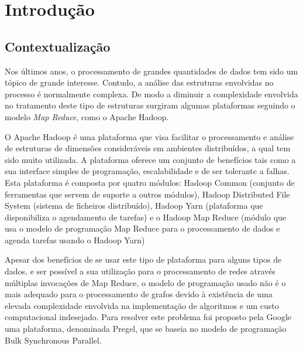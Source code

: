 \chapter{Introdução}

\section{Contextualização}
Nos últimos anos, o processamento de grandes quantidades de dados tem sido um tópico de grande interesse. Contudo, a análise das estruturas envolvidas no processo 
é normalmente complexa. De modo a diminuir a complexidade envolvida no tratamento deste tipo de estruturas surgiram algumas plataformas seguindo o modelo \textit{Map Reduce}, como o Apache Hadoop\cite{hadoop}.

O Apache Hadoop\cite{hadoop} é uma plataforma que visa facilitar o processamento e análise de estruturas de dimensões consideráveis em ambientes distribuídos, a qual tem sido muito utilizada.
A plataforma oferece um conjunto de benefícios tais como a sua interface simples de programação, escalabilidade e de ser tolerante a falhas.
Esta plataforma é composta por quatro módulos:
Hadoop Common (conjunto de ferramentas que servem de suporte a outros módulos),
Hadoop Distributed File System (sistema de ficheiros distribuído),
Hadoop Yarn (plataforma que disponibiliza o agendamento de tarefas)
e o Hadoop Map Reduce (módulo que usa o modelo de programação Map Reduce para o processamento de dados e agenda tarefas usando o Hadoop Yarn)

Apesar dos benefícios de se usar este tipo de plataforma para alguns tipos de dados, e ser possível a sua utilização para o processamento de redes através múltiplas invocações de Map Reduce, o modelo de programação usado  não é o mais adequado para o processamento de grafos devido à existência de  uma elevada complexidade envolvida na implementação de algoritmos e um custo computacional indesejado.
Para resolver este problema foi proposto pela Google uma plataforma, denominada Pregel\cite{pregel}, que se baseia no modelo de programação Bulk Synchronous Parallel\cite{bsp}.

